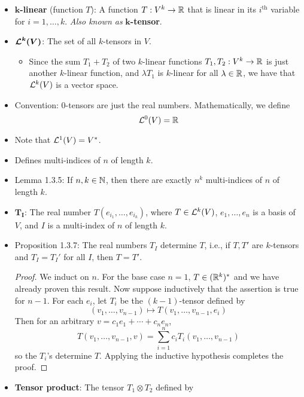 \documentclass[../notes.tex]{subfiles}
\begin{document}
\begin{itemize}
    \item \textbf{$\bm{k}$-linear} (function $T$): A function $T:V^k\to\R$ that is linear in its $i^\text{th}$ variable for $i=1,\dots,k$. \emph{Also known as} \textbf{$\bm{k}$-tensor}.
    \item $\bm{\lin[k]{V}}$: The set of all $k$-tensors in $V$.
    \begin{itemize}
        \item Since the sum $T_1+T_2$ of two $k$-linear functions $T_1,T_2:V^k\to\R$ is just another $k$-linear function, and $\lambda T_1$ is $k$-linear for all $\lambda\in\R$, we have that $\lin[k]{V}$ is a vector space.
    \end{itemize}
    \item Convention: 0-tensors are just the real numbers. Mathematically, we define
    \begin{equation*}
        \lin[0]{V} = \R
    \end{equation*}
    \item Note that $\lin[1]{V}=V^*$.
    \item Defines multi-indices of $n$ of length $k$.
    \item Lemma 1.3.5: If $n,k\in\N$, then there are exactly $n^k$ multi-indices of $n$ of length $k$.
    \item $\bm{T_I}$: The real number $T(e_{i_1},\dots,e_{i_k})$, where $T\in\lin[k]{V}$, $e_1,\dots,e_n$ is a basis of $V$, and $I$ is a multi-index of $n$ of length $k$.
    \item Proposition 1.3.7: The real numbers $T_I$ determine $T$, i.e., if $T,T'$ are $k$-tensors and $T_I=T_I'$ for all $I$, then $T=T'$.
    \begin{proof}
        We induct on $n$. For the base case $n=1$, $T\in(\R^k)^*$ and we have already proven this result. Now suppose inductively that the assertion is true for $n-1$. For each $e_i$, let $T_i$ be the $(k-1)$-tensor defined by
        \begin{equation*}
            (v_1,\dots,v_{n-1}) \mapsto T(v_1,\dots,v_{n-1},e_i)
        \end{equation*}
        Then for an arbitrary $v=c_1e_1+\cdots+c_ne_n$,
        \begin{equation*}
            T(v_1,\dots,v_{n-1},v) = \sum_{i=1}^nc_iT_i(v_1,\dots,v_{n-1})
        \end{equation*}
        so the $T_i$'s determine $T$. Applying the inductive hypothesis completes the proof.
    \end{proof}
    \item \textbf{Tensor product}: The tensor $T_1\otimes T_2$ defined by

\end{itemize}
\end{document}
